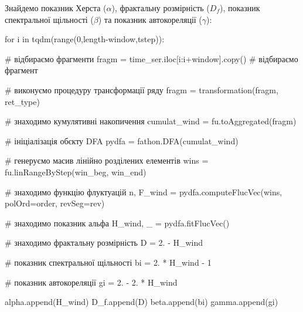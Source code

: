 \documentclass[
  letterpaper,
]{report}
\newenvironment{Shaded}{\begin{snugshade}}{\end{snugshade}}
\newcommand{\BuiltInTok}[1]{\textcolor[rgb]{0.00,0.23,0.31}{#1}}
\newcommand{\CommentTok}[1]{\textcolor[rgb]{0.37,0.37,0.37}{#1}}
\newcommand{\ControlFlowTok}[1]{\textcolor[rgb]{0.00,0.23,0.31}{#1}}
\newcommand{\DecValTok}[1]{\textcolor[rgb]{0.68,0.00,0.00}{#1}}
\newcommand{\FloatTok}[1]{\textcolor[rgb]{0.68,0.00,0.00}{#1}}
\newcommand{\KeywordTok}[1]{\textcolor[rgb]{0.00,0.23,0.31}{#1}}
\newcommand{\NormalTok}[1]{\textcolor[rgb]{0.00,0.23,0.31}{#1}}
\newcommand{\OperatorTok}[1]{\textcolor[rgb]{0.37,0.37,0.37}{#1}}
\begin{document}
Знайдемо показник Херста (\(\alpha\)), фрактальну розмірність (\(D_f\)),
показник спектральної щільності (\(\beta\)) та показник автокореляції
(\(\gamma\)):

\begin{Shaded}
\begin{Highlighting}[]
\ControlFlowTok{for}\NormalTok{ i }\KeywordTok{in}\NormalTok{ tqdm(}\BuiltInTok{range}\NormalTok{(}\DecValTok{0}\NormalTok{,length}\OperatorTok{{-}}\NormalTok{window,tstep)):}
    
    \CommentTok{\# відбираємо фрагменти}
\NormalTok{    fragm }\OperatorTok{=}\NormalTok{ time\_ser.iloc[i:i}\OperatorTok{+}\NormalTok{window].copy() }\CommentTok{\# відбираємо фрагмент  }

    \CommentTok{\# виконуємо процедуру трансформації ряду }
\NormalTok{    fragm }\OperatorTok{=}\NormalTok{ transformation(fragm, ret\_type)}

    \CommentTok{\# знаходимо кумулятивні накопичення}
\NormalTok{    cumulat\_wind }\OperatorTok{=}\NormalTok{ fu.toAggregated(fragm) }

    \CommentTok{\# ініціалізація об\textquotesingle{}єкту DFA}
\NormalTok{    pydfa }\OperatorTok{=}\NormalTok{ fathon.DFA(cumulat\_wind) }

    \CommentTok{\# генеруємо масив лінійно розділених елементів}
\NormalTok{    wins }\OperatorTok{=}\NormalTok{ fu.linRangeByStep(win\_beg, win\_end) }

    \CommentTok{\# знаходимо функцію флуктуацій}
\NormalTok{    n, F\_wind }\OperatorTok{=}\NormalTok{ pydfa.computeFlucVec(wins, polOrd}\OperatorTok{=}\NormalTok{order, revSeg}\OperatorTok{=}\NormalTok{rev)    }

    \CommentTok{\# знаходимо показник альфа}
\NormalTok{    H\_wind, \_ }\OperatorTok{=}\NormalTok{ pydfa.fitFlucVec()}

    \CommentTok{\# знаходимо фрактальну розмірність        }
\NormalTok{    D }\OperatorTok{=} \FloatTok{2.} \OperatorTok{{-}}\NormalTok{ H\_wind}

    \CommentTok{\# показник спектральної щільності}
\NormalTok{    bi }\OperatorTok{=} \FloatTok{2.} \OperatorTok{*}\NormalTok{ H\_wind }\OperatorTok{{-}} \DecValTok{1} 

    \CommentTok{\# показник автокореляції}
\NormalTok{    gi }\OperatorTok{=} \FloatTok{2.} \OperatorTok{{-}} \FloatTok{2.} \OperatorTok{*}\NormalTok{ H\_wind}

\NormalTok{    alpha.append(H\_wind)}
\NormalTok{    D\_f.append(D)}
\NormalTok{    beta.append(bi)}
\NormalTok{    gamma.append(gi)}
\end{Highlighting}
\end{Shaded}
\end{document}
